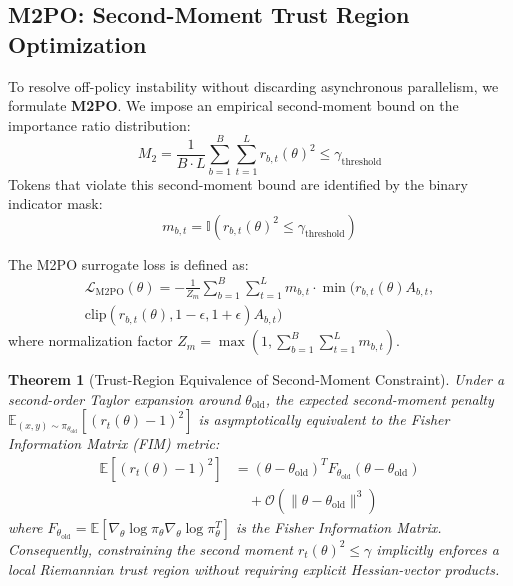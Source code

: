 \documentclass[10pt,twocolumn,letterpaper]{article}
\newtheorem{theorem}{Theorem}
\begin{document}
\subsection{M2PO: Second-Moment Trust Region Optimization}

To resolve off-policy instability without discarding asynchronous parallelism, we formulate \textbf{M2PO}. We impose an empirical second-moment bound on the importance ratio distribution:
\begin{equation}
    M_2 = \frac{1}{B \cdot L} \sum_{b=1}^B \sum_{t=1}^L r_{b,t}(\theta)^2 \le \gamma_{\text{threshold}}
\end{equation}
Tokens that violate this second-moment bound are identified by the binary indicator mask:
\begin{equation}
    m_{b,t} = \mathbb{I}\left( r_{b,t}(\theta)^2 \le \gamma_{\text{threshold}} \right)
\end{equation}

The M2PO surrogate loss is defined as:
\begin{equation}
\begin{split}
    \mathcal{L}_{\text{M2PO}}(\theta) = -\frac{1}{Z_m} \sum_{b=1}^B \sum_{t=1}^L m_{b,t} \cdot \min\Big( r_{b,t}(\theta) A_{b,t}, \\
    \text{clip}(r_{b,t}(\theta), 1-\epsilon, 1+\epsilon) A_{b,t} \Big)
\end{split}
\end{equation}
where normalization factor $Z_m = \max\left(1, \sum_{b=1}^B \sum_{t=1}^L m_{b,t}\right)$.

\begin{theorem}[Trust-Region Equivalence of Second-Moment Constraint]
Under a second-order Taylor expansion around $\theta_{\text{old}}$, the expected second-moment penalty $\mathbb{E}_{(x,y) \sim \pi_{\theta_{\text{old}}}}[(r_t(\theta) - 1)^2]$ is asymptotically equivalent to the Fisher Information Matrix (FIM) metric:
\begin{equation}
\begin{split}
    \mathbb{E}\left[ (r_t(\theta) - 1)^2 \right] &= (\theta - \theta_{\text{old}})^T F_{\theta_{\text{old}}} (\theta - \theta_{\text{old}}) \\
    &\quad + \mathcal{O}(\|\theta - \theta_{\text{old}}\|^3)
\end{split}
\end{equation}
where $F_{\theta_{\text{old}}} = \mathbb{E}[\nabla_\theta \log \pi_\theta \nabla_\theta \log \pi_\theta^T]$ is the Fisher Information Matrix. Consequently, constraining the second moment $r_t(\theta)^2 \le \gamma$ implicitly enforces a local Riemannian trust region without requiring explicit Hessian-vector products.
\end{theorem}
\end{document}
